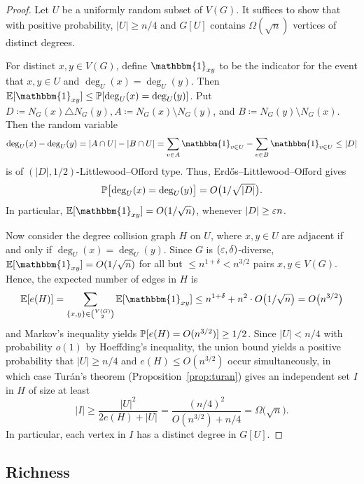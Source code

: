 \begin{proof}
  Let $U$ be a uniformly random subset of $V(G)$. It suffices to show that with positive probability, $|U| \geq n/4$ and $G[U]$ contains $\Omega(\sqrt{n})$ vertices of distinct degrees. 

  For distinct $x, y \in V(G)$, define $\mathbbm{1}_{xy}$ to be the indicator for the event that $x, y \in U$ and $\deg_U(x) = \deg_U(y)$. Then $\E[\mathbbm{1}_{xy}] \leq \prob[\deg_U(x) = \deg_U(y)]$. Put $D \coloneqq N_G(x) \triangle N_G(y), A \coloneqq N_G(x) \setminus N_G(y)$, and $B \coloneqq N_G(y) \setminus N_G(x)$. Then the random variable
  \[
    \deg_U(x) - \deg_U(y) = |A \cap U| - |B \cap U| = \sum_{v \in A} \mathbbm{1}_{v \in U} - \sum_{v \in B} \mathbbm{1}_{v \in U} \leq |D|
  \]
  is of $(|D|, 1/2)$-Littlewood--Offord type. Thus, Erd\H{o}s--Littlewood--Offord gives
  \[
    \mathbb{P}\bigl[\operatorname{deg}_U(x) = \operatorname{deg}_U(y)\bigr] = O\bigl(1/\sqrt{|D|}\bigr).
  \]
  In particular, $\E[\mathbbm{1}_{xy}] = O(1/\sqrt{n})$, whenever $|D| \geq \varepsilon n$.

  Now consider the degree collision graph $H$ on $U$, where $x, y \in U$ are adjacent if and only if $\deg_U(x) = \deg_U(y)$. Since $G$ is $(\varepsilon, \delta)$-diverse, $\E[\mathbbm{1}_{xy}] = O(1/\sqrt{n})$ for all but $\leq n^{1 + \delta} < n^{3/2}$ pairs $x, y \in V(G)$. Hence, the expected number of edges in $H$ is
  \[
    \E[e(H)] = \sum_{\{x, y\} \in \binom{V(G)}{2}} \E[\mathbbm{1}_{xy}] \leq n^{1 + \delta} + n^2 \cdot O\bigl(1/\sqrt{n}\bigr) = O\bigl(n^{3/2}\bigr)
  \] 
  and Markov's inequality yields $\mathbb{P}[e(H) = O(n^{3/2})] \geq 1/2$. Since $|U| < n/4$ with probability $o(1)$ by Hoeffding's inequality, the union bound yields a positive probability that $|U| \geq n/4$ and $e(H) \leq O(n^{3/2})$ occur simultaneously, in which case Tur\'{a}n's theorem (Proposition~\ref{prop:turan}) gives an independent set $I$ in $H$ of size at least 
  \[
    |I| \geq \frac{|U|^2}{2e(H) + |U|} = \frac{(n/4)^2}{O(n^{3/2}) + n/4} = \Omega\bigl(\sqrt{n}\bigr).
  \]
  In particular, each vertex in $I$ has a distinct degree in $G[U]$.
\end{proof}


\subsection{Richness}

